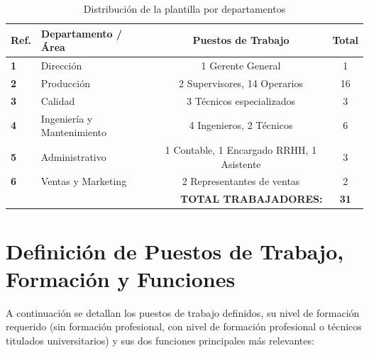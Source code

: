 \begin{table}[H]
    \centering
    \caption{Distribución de la plantilla por departamentos}
    \label{tab:resumen_personal}
    \begin{tabular}{@{}llcc@{}}
        \toprule
        \textbf{Ref.}                                    & \textbf{Departamento / Área} & \textbf{Puestos de Trabajo}               & \textbf{Total} \\
        \midrule
        \textbf{1}                                       & Dirección                    & 1 Gerente General                         & 1              \\
        \textbf{2}                                       & Producción                   & 2 Supervisores, 14 Operarios              & 16             \\
        \textbf{3}                                       & Calidad                      & 3 Técnicos especializados                 & 3              \\
        \textbf{4}                                       & Ingeniería y Mantenimiento   & 4 Ingenieros, 2 Técnicos                  & 6              \\
        \textbf{5}                                       & Administrativo               & 1 Contable, 1 Encargado RRHH, 1 Asistente & 3              \\
        \textbf{6}                                       & Ventas y Marketing           & 2 Representantes de ventas                & 2              \\
        \midrule
        \multicolumn{3}{r}{\textbf{TOTAL TRABAJADORES:}} & \textbf{31}                                                                               \\
        \bottomrule
    \end{tabular}
\end{table}

\section{Definición de Puestos de Trabajo, Formación y Funciones}

A continuación se detallan los puestos de trabajo definidos, su nivel de formación requerido (sin formación profesional, con nivel de formación profesional o técnicos titulados universitarios) y sus dos funciones principales más relevantes:

